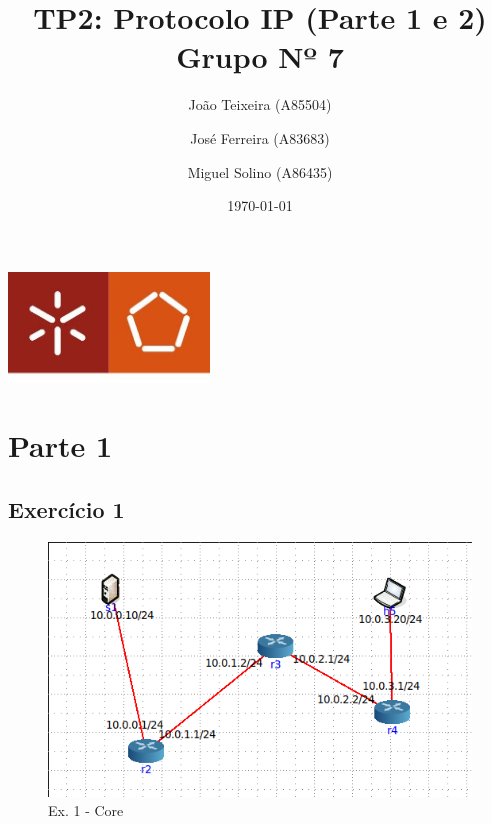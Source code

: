 \documentclass[a4paper]{report}
\begin{document}
\title{TP2:  Protocolo IP (Parte 1 e 2)\\ 
\large Grupo Nº 7}
\author{João Teixeira (A85504) \and José Ferreira (A83683) \and Miguel Solino (A86435)}

\date{\today}

\begin{center}
    \begin{minipage}{0.75\linewidth}
        \centering
        \includegraphics[width=0.4\textwidth]{images/eng.jpeg}\par\vspace{1cm}
        \vspace{1cm}
        \href{https://www.uminho.pt/PT}
        {\color{black}{\scshape\LARGE Universidade do Minho}} \par
        \vspace{1cm}
        \href{https://www.di.uminho.pt/}
        {\color{black}{\scshape\Large Departamento de Informática}} \par
        \maketitle
    \end{minipage}
\end{center}

\tableofcontents

\pagebreak
\chapter{Parte 1}
\section{Exercício 1}

\begin{figure}[H]
    \centering 
    \includegraphics[width=\textwidth]{images/coreEx1.png}  
    \caption{Ex. 1 - Core}
    \label{fig:coreEx1}
\end{figure}
\end{document}
